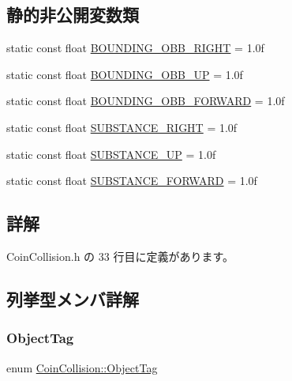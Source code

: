 \subsection*{静的非公開変数類}
\begin{DoxyCompactItemize}
\item 
static const float \mbox{\hyperlink{class_coin_collision_a4477f2cf482af3295f6bc457b1c55d7d}{B\+O\+U\+N\+D\+I\+N\+G\+\_\+\+O\+B\+B\+\_\+\+R\+I\+G\+HT}} = 1.\+0f
\item 
static const float \mbox{\hyperlink{class_coin_collision_ab8bfe7f01de3527c12fa57169630c9dd}{B\+O\+U\+N\+D\+I\+N\+G\+\_\+\+O\+B\+B\+\_\+\+UP}} = 1.\+0f
\item 
static const float \mbox{\hyperlink{class_coin_collision_ae8d9f9859d5399026f24ada82b545dc7}{B\+O\+U\+N\+D\+I\+N\+G\+\_\+\+O\+B\+B\+\_\+\+F\+O\+R\+W\+A\+RD}} = 1.\+0f
\item 
static const float \mbox{\hyperlink{class_coin_collision_aa8f9e6be6e1b384fb5db936f2f3fe29d}{S\+U\+B\+S\+T\+A\+N\+C\+E\+\_\+\+R\+I\+G\+HT}} = 1.\+0f
\item 
static const float \mbox{\hyperlink{class_coin_collision_a5d8b3e5d27c1f87758fa721041c5a45a}{S\+U\+B\+S\+T\+A\+N\+C\+E\+\_\+\+UP}} = 1.\+0f
\item 
static const float \mbox{\hyperlink{class_coin_collision_a44cb9f131326f39e4d7072c07d5023ac}{S\+U\+B\+S\+T\+A\+N\+C\+E\+\_\+\+F\+O\+R\+W\+A\+RD}} = 1.\+0f
\end{DoxyCompactItemize}


\subsection{詳解}


 Coin\+Collision.\+h の 33 行目に定義があります。



\subsection{列挙型メンバ詳解}
\mbox{\label{class_coin_collision_ade7912345747f522fd895e87621ce049}} 
\subsubsection{\texorpdfstring{Object\+Tag}{ObjectTag}}
{\footnotesize\ttfamily enum \mbox{\hyperlink{class_coin_collision_ade7912345747f522fd895e87621ce049}{Coin\+Collision\+::\+Object\+Tag}}}

